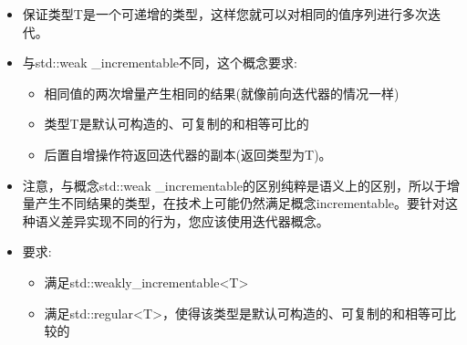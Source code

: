 \begin{itemize}
\item
保证类型T是一个可递增的类型，这样您就可以对相同的值序列进行多次迭代。

\item
与std::weak \_incrementable不同，这个概念要求:

\begin{itemize}
\item
相同值的两次增量产生相同的结果(就像前向迭代器的情况一样)

\item
类型T是默认可构造的、可复制的和相等可比的

\item
后置自增操作符返回迭代器的副本(返回类型为T)。
\end{itemize}

\item
注意，与概念std::weak \_incrementable的区别纯粹是语义上的区别，所以于增量产生不同结果的类型，在技术上可能仍然满足概念incrementable。要针对这种语义差异实现不同的行为，您应该使用迭代器概念。

\item
要求:
\begin{itemize}
\item
满足std::weakly\_incrementable<T>

\item
满足std::regular<T>，使得该类型是默认可构造的、可复制的和相等可比较的
\end{itemize}
\end{itemize}
